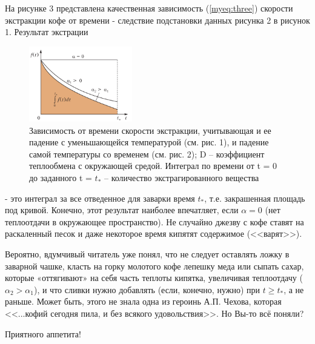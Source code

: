 \begin{multicols}{2}
	На рисунке 3 представлена качественная зависимость (\ref{myeq:three}) скорости экстракции кофе от времени - следствие подстановки
	данных рисунка 2 в рисунок 1. Результат экстрации
	\setlength{\belowcaptionskip}{-10pt} 
	\begin{figure}[H]
		\centering
		\includegraphics[width=0.4\textwidth]{pic2.png}
		\caption{Зависимость от времени скорости экстракции, учитывающая и ее падение с уменьшающейся температурой (см. рис. 1), и падение
			самой температуры со временем (см. рис. 2);
			D – коэффициент теплообмена с окружающей
			средой. Интеграл по времени от t = 0 до
			заданного t = $t_*$
			– количество экстрагированного вещества}
	\end{figure}
	\noindent
	- это интеграл за все отведенное для заварки время $t_*$, т.е. закрашенная площадь под кривой. Конечно, этот
	результат наиболее впечатляет, если $\alpha = 0$ (нет теплоотдачи в окружающее пространство). Не случайно
	джезву с кофе ставят на раскаленный песок и даже некоторое время кипятят содержимое (<<варят>>).
	
	Вероятно, вдумчивый читатель уже понял, что не следует оставлять ложку в заварной чашке, класть на горку
	молотого кофе лепешку меда или сыпать сахар, которые «оттягивают» на себя часть теплоты кипятка, увеличивая
	теплоотдачу ($\alpha_2 > \alpha_1$), и что сливки нужно добавлять (если, конечно, нужно) при
	$t\geq t_*$, а не раньше. Может быть, этого не знала одна из героинь А.П. Чехова, которая <<...кофий сегодня пила,
	и без всякого удовольствия>>. Но Вы-то всё поняли?
	
	Приятного аппетита!
\end{multicols}
\newpage
